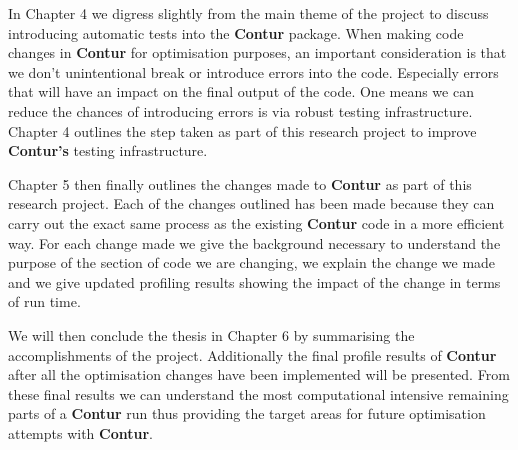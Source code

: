 In Chapter 4 we digress slightly from the main theme of the project to discuss introducing automatic tests into the \textbf{Contur} package. When making code changes in \textbf{Contur} for optimisation purposes, an important consideration is that we don't unintentional break or introduce errors into the code. Especially errors that will have an impact on the final output of the code. One means we can reduce the chances of introducing errors is via robust testing infrastructure. Chapter 4 outlines the step taken as part of this research project to improve \textbf{Contur's} testing infrastructure.

Chapter 5 then finally outlines the changes made to \textbf{Contur}  as part of this research project. Each of the changes outlined has been made because they can carry out the exact same process as the existing \textbf{Contur}  code in a more efficient way. For each change made we give the background necessary to understand the purpose of the section of code we are changing, we explain the change we made and we give updated profiling results showing the impact of the change in terms of run time.

We will then conclude the thesis in Chapter 6 by summarising the accomplishments of the project. Additionally the final profile results of \textbf{Contur}  after all the optimisation changes have been implemented will be presented. From these final results we can understand the most computational intensive remaining parts of a \textbf{Contur}  run thus providing the target areas for future optimisation attempts with \textbf{Contur}.  

